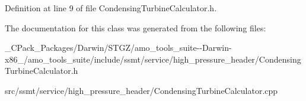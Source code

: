 Definition at line 9 of file Condensing\+Turbine\+Calculator.\+h.



The documentation for this class was generated from the following files\+:\begin{DoxyCompactItemize}
\item 
\+\_\+\+C\+Pack\+\_\+\+Packages/\+Darwin/\+S\+T\+G\+Z/amo\+\_\+tools\+\_\+suite-\/-\/\+Darwin-\/x86\+\_/amo\+\_\+tools\+\_\+suite/include/ssmt/service/high\+\_\+pressure\+\_\+header/Condensing\+Turbine\+Calculator.\+h\item 
src/ssmt/service/high\+\_\+pressure\+\_\+header/Condensing\+Turbine\+Calculator.\+cpp\end{DoxyCompactItemize}

